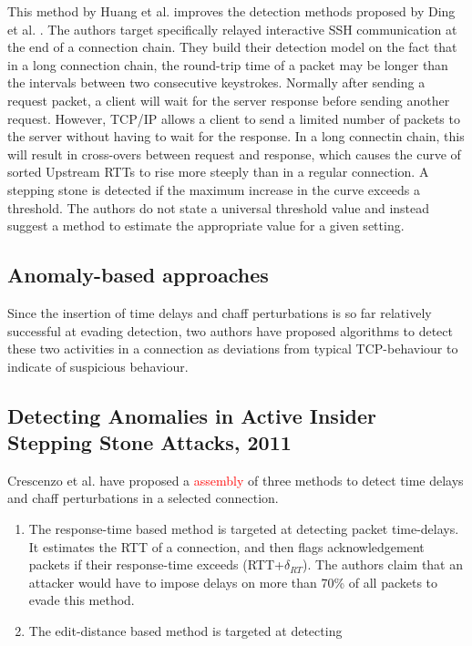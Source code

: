 \documentclass[conference]{IEEEtran}\usepackage[]{graphicx}\usepackage[]{color}
\begin{document}
This method by Huang et al. \cite{huang2016detecting} improves the detection methods proposed by Ding et al. \cite{ding2009detecting}. The authors target specifically relayed interactive SSH communication at the end of a connection chain. They build their detection model on the fact that in a long connection chain, the round-trip time of a packet may be longer than the intervals between two consecutive keystrokes. Normally after sending a request packet, a client will wait for the server response before sending another request. However, TCP/IP allows a client to send a limited number of packets to the server without having to wait for the response. In a long connectin chain, this will result in cross-overs between request and response, which causes the curve of sorted Upstream RTTs to rise more steeply than in a regular connection. A stepping stone is detected if the maximum increase in the curve exceeds a threshold. The authors do not state a universal threshold value and instead suggest a method to estimate the appropriate value for a given setting.






\subsection{Anomaly-based approaches}

Since the insertion of time delays and chaff perturbations is so far relatively successful at evading detection, two authors have proposed algorithms to detect these two activities in a connection as deviations from typical TCP-behaviour to indicate of suspicious behaviour. 

\subsection{Detecting Anomalies in Active Insider Stepping Stone Attacks, 2011}

Crescenzo et al. \cite{di2011detecting} have proposed a \textcolor{red}{assembly} of three methods to detect time delays and chaff perturbations in a selected connection. 
\begin{enumerate}
\item The response-time based method is targeted at detecting packet time-delays. It estimates the RTT of a connection, and then flags acknowledgement packets if their response-time exceeds (RTT+$\delta_{RT}$). The authors claim that an attacker would have to impose delays on more than 70\% of all packets to evade this method.
\item The edit-distance based method is targeted at detecting 
\end{enumerate}
\end{document}
